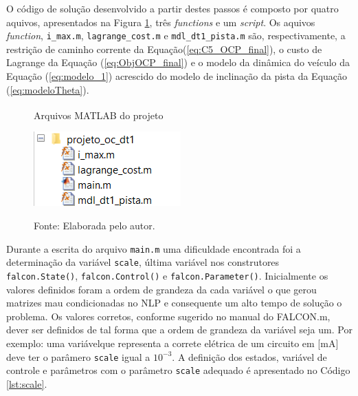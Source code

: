 O código de solução desenvolvido a partir destes passos é composto por quatro aquivos, apresentados na Figura \ref{fig:matlab_files}, três \textit{functions} e um \textit{script}. Os aquivos \textit{function}, \lstinline[style=Matlab-editor]{i_max.m},
\lstinline[style=Matlab-editor]{lagrange_cost.m} e \lstinline[style=Matlab-editor]{mdl_dt1_pista.m} são, respectivamente, 
a restrição de caminho corrente da Equação(\ref{eq:C5_OCP_final}), o custo de Lagrange da Equação (\ref{eq:ObjOCP_final}) e o modelo da dinâmica do veículo da Equação (\ref{eq:modelo_1}) acrescido do modelo de inclinação da pista da Equação (\ref{eq:modeloTheta}).

\begin{figure}[h]
    \centering
    \caption{Arquivos MATLAB\textsuperscript{\textregistered} do projeto}
    \includegraphics[]{Metodologia/Figuras/matlab_files.png}
    \label{fig:matlab_files}
    \caption*{\footnotesize{Fonte: Elaborada pelo autor.}}
\end{figure}


Durante a escrita do arquivo \lstinline[style=Matlab-editor]{main.m} uma dificuldade encontrada foi a determinação da variável \lstinline[style=Matlab-editor]{scale}, 
última  variável nos construtores \lstinline[style=Matlab-editor]{falcon.State()}, \lstinline[style=Matlab-editor]{falcon.Control()} e \lstinline[style=Matlab-editor]{falcon.Parameter()}.
Inicialmente os valores definidos foram a ordem de grandeza da cada variável o que gerou matrizes mau condicionadas no NLP e consequente um alto tempo de solução o problema. 
Os valores corretos, conforme sugerido no manual do FALCON.m\cite{manual:Falcon}, dever ser definidos de tal forma que a ordem de grandeza da variável seja um. Por exemplo: uma variávelque
representa a correte elétrica de um circuito em [mA] deve ter o parâmero \lstinline[style=Matlab-editor]{scale} igual a $10^{-3}$. 
A definição dos estados, variável de controle e parâmetros com o parâmetro \lstinline[style=Matlab-editor]{scale} adequado é apresentado no Código \ref{lst:scale}. 

